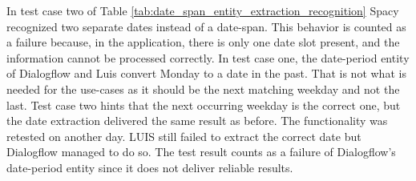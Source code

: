 In test case two of Table \ref{tab:date_span_entity_extraction_recognition} Spacy recognized two separate dates instead of a date-span.
This behavior is counted as a failure because, in the application, there is only one date slot present, and the information cannot be processed correctly.
In test case one, the date-period entity of Dialogflow and Luis convert Monday to a date in the past.
That is not what is needed for the use-cases as it should be the next matching weekday and not the last.
Test case two hints that the next occurring weekday is the correct one, but the date extraction delivered the same result as before.
The functionality was retested on another day.
LUIS still failed to extract the correct date but Dialogflow 
managed to do so.
The test result counts as a failure of Dialogflow's date-period entity since it does not deliver reliable results.

